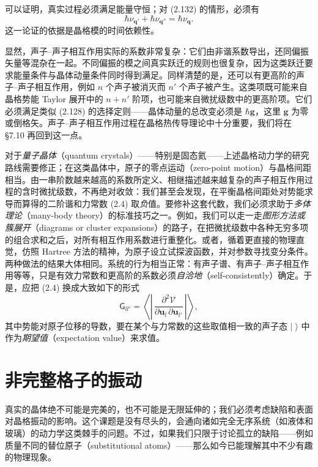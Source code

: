 可以证明，真实过程必须满足能量守恒；对 (2.132) 的情形，必须有
\begin{equation*}
\hbar\nu_{\mathbf{q}'}+\hbar\nu_{\mathbf{q}''}=\hbar\nu_{\mathbf{q}}.
\tag{2.133}
\end{equation*}
这一论证的依据是晶格模的时间依赖性。

显然，声子–声子相互作用实际的系数非常复杂：它们由非谐系数导出，还同偏振矢量等混杂在一起。不同偏振的模之间真实跃迁的规则也很复杂，因为这类跃迁要求能量条件与晶体动量条件同时得到满足。同样清楚的是，还可以有更高阶的声子–声子相互作用，例如 $n$ 个声子被消灭而 $n'$ 个声子被产生。这类项既可能来自晶格势能 Taylor 展开中的 $n+n'$ 阶项，也可能来自微扰级数中的更高阶项。它们必须满足类似 (2.128) 的选择定则——晶体动量的总改变必须是 $\hbar\mathbf{g}$，这里 $\mathbf{g}$ 为零或倒格矢。声子–声子相互作用过程在晶格热传导理论中十分重要，我们将在 §7.10 再回到这一点。

对于\emph{量子晶体}（quantum crystals）——特别是固态氦——上述晶格动力学的研究路线需要修正；在这类晶体中，原子的零点运动（zero-point motion）与晶格间距相当。由一串阶数越来越高的系数所定义、相继描述越来越复杂的声子相互作用过程的含时微扰级数，不再绝对收敛：我们甚至会发现，在平衡晶格间距处对势能求导而算得的二阶谐和力常数 (2.4) 取\emph{负}值。要修补这套代数，我们必须求助于\emph{多体理论}（many-body theory）的标准技巧之一。例如，我们可以走一走\emph{图形方法或簇展开}（diagrams or cluster expansions）的路子，在把微扰级数中各种无穷多项的组合求和之后，对所有相互作用系数进行重整化。或者，循着更直接的物理直觉，仿照 Hartree 方法的精神，为原子设立试探波函数，并对参数寻找变分条件。两种做法的结果大体相同。系统的行为相当正常：有声子谱、有声子–声子相互作用等等，只是有效力常数和更高阶的系数必须\emph{自洽地}（self-consistently）确定。于是，应把 (2.4) 换成大致如下的形式
\begin{equation*}
\mathsf{G}_{ll'}=\left\langle\left|\,\frac{\partial^2\mathcal{V}}{\partial\mathbf{u}_l\,\partial\mathbf{u}_{l'}}\,\right|\right\rangle,
\tag{2.134}
\end{equation*}
其中势能对原子位移的导数，要在某个与力常数的这些取值相一致的声子态 $|\;\rangle$ 中作为\emph{期望值}（expectation value）来求值。

\section{非完整格子的振动}

真实的晶体绝不可能是完美的，也不可能是无限延伸的；我们必须考虑缺陷和表面对晶格振动的影响。这个课题是没有尽头的，会通向诸如完全无序系统（如液体和玻璃）的动力学这类棘手的问题。不过，如果我们只限于讨论孤立的缺陷——例如质量不同的替位原子（substitutional atoms）——那么如今已能理解其中不少有趣的物理现象。

